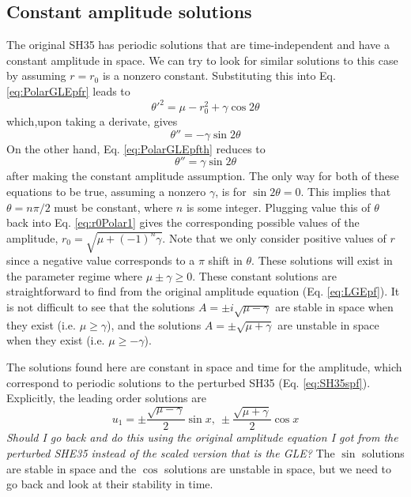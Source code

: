 \documentclass[api,pof,pre,12pt,a4paper]{revtex4-1}
\newcommand{\beqn}{\begin{equation}}
\newcommand{\eeqn}{\end{equation}}
\begin{document}
\subsection{Constant amplitude solutions}
The original SH35 has periodic solutions that are time-independent and have a constant amplitude in space.  We can try to look for similar solutions to this case by assuming $r=r_0$ is a nonzero constant. Substituting this into Eq. \ref{eq:PolarGLEpfr} leads to
\beqn
\theta'^2=\mu-r_0^2+\gamma \cos2\theta
\label{eq:r0Polar1}
\eeqn
which,upon taking a derivate, gives
\beqn
\theta''=-\gamma \sin2\theta
\eeqn
On the other hand, Eq. \ref{eq:PolarGLEpfth} reduces to 
\beqn
\theta''=\gamma \sin2\theta
\eeqn
after making the constant amplitude assumption.  The only way for both of these equations to be true, assuming a nonzero $\gamma$, is for $\sin2\theta=0$. This implies that $\theta=n\pi/2$ must be constant, where $n$ is some integer.  Plugging value this of $\theta$ back into Eq. \ref{eq:r0Polar1} gives the corresponding possible values of the amplitude, $r_0=\sqrt{\mu +(-1)^n\gamma}$. Note that we only consider positive values of $r$ since a negative value corresponds to a $\pi$ shift in $\theta$. These solutions will exist in the parameter regime where $\mu\pm\gamma\ge 0$.  These constant solutions are straightforward to find from the original amplitude equation (Eq. \ref{eq:LGEpf}).  It is not difficult to see that the solutions $A=\pm i \sqrt{\mu-\gamma}$ are stable in space when they exist (i.e. $\mu \geq \gamma$), and the solutions $A=\pm \sqrt{\mu+\gamma}$ are unstable in space when they exist (i.e. $\mu \geq-\gamma$).


The solutions found here are constant in space and time for the amplitude, which correspond to periodic solutions to the perturbed SH35 (Eq. \ref{eq:SH35spf}). Explicitly, the leading order solutions are 
\beqn
u_1=\pm \frac{\sqrt{\mu-\gamma}}{2} \sin x,\: \pm \frac{\sqrt{\mu+\gamma}}{2} \cos x
\eeqn
{\it Should I go back and do this using the original amplitude equation I got from the perturbed SHE35 instead of the scaled version that is the GLE?}
The $\sin$ solutions are stable in space and the $\cos$ solutions are unstable in space, but we need to go back and look at their stability in time.
\end{document}
